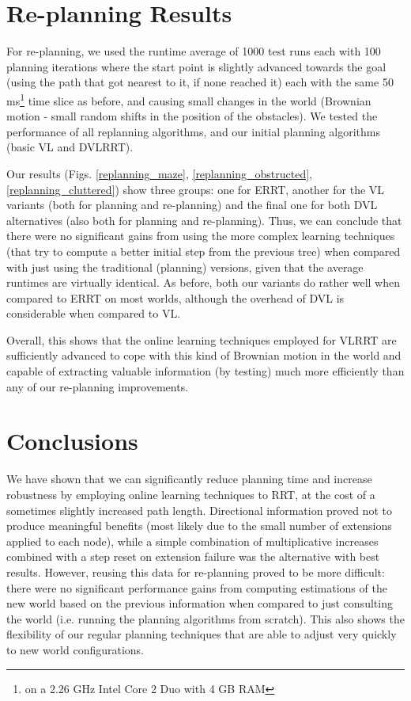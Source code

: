 \documentclass[10pt,twoside,twocolumn]{article}
\begin{document}
\section{Re-planning Results}

For re-planning, we used the runtime average of 1000 test runs each
with 100 planning iterations where the start point is slightly
advanced towards the goal (using the path that got nearest to it, if none reached it)
each with the same 50 ms\footnote{on a 2.26 GHz Intel Core 2 Duo with
  4 GB RAM} time slice as before, and causing small changes in the world
(Brownian motion - small random shifts in the position of the
obstacles). We tested the performance of all replanning algorithms, 
and our initial planning algorithms (basic VL and DVLRRT).

Our results (Figs. \ref{replanning_maze}, \ref{replanning_obstructed}, \ref{replanning_cluttered}) 
show three groups: one for ERRT, another for the VL variants (both for
planning and re-planning) and the final one for both DVL
alternatives (also both for planning and re-planning). 
Thus, we can conclude that there were no significant gains 
from using the more complex learning techniques (that try to compute a
better initial step from the previous tree) 
when compared with just using the traditional (planning) versions,
given that the average runtimes are virtually identical. 
As before, both our variants do rather well when compared to ERRT 
on most worlds, although the overhead of DVL is considerable when compared to VL.

Overall, this shows that the online learning techniques employed for
VLRRT are sufficiently advanced to cope with this kind of Brownian
motion in the world 
and capable of extracting valuable information (by testing) much more efficiently 
than any of our re-planning improvements.

\section{Conclusions}

We have shown that we can significantly reduce planning time and
increase robustness by employing online learning techniques to RRT, 
at the cost of a sometimes slightly increased path length. Directional 
information proved not to produce meaningful benefits (most likely due
to the small number of extensions applied to each node), 
while a simple combination of multiplicative increases combined with 
a step reset on extension failure was the alternative with best results. 
However, reusing this data for re-planning proved to be more
difficult: there were no significant performance gains from computing 
estimations of the new world based on the previous information 
when compared to just consulting the world (i.e. running the planning
algorithms from scratch). This also shows the flexibility of our
regular planning techniques that are able to adjust very quickly to
new world configurations.
\end{document}
